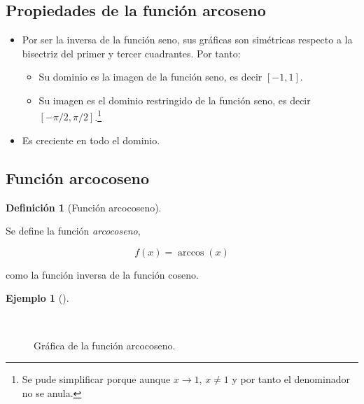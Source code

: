\documentclass[
  a4paper,
]{scrreport}
\providecommand{\tightlist}{%
  \setlength{\itemsep}{0pt}\setlength{\parskip}{0pt}}\usepackage{longtable,booktabs,array}
\theoremstyle{plain}
\theoremstyle{plain}
\theoremstyle{definition}
\newtheorem{definition}{Definición}[chapter]
\theoremstyle{plain}
\theoremstyle{definition}
\newtheorem{example}{Ejemplo}[chapter]
\theoremstyle{remark}
\begin{document}
\hypertarget{propiedades-de-la-funciuxf3n-arcoseno}{%
\subsection{Propiedades de la función
arcoseno}\label{propiedades-de-la-funciuxf3n-arcoseno}}

\begin{itemize}
\tightlist
\item
  Por ser la inversa de la función seno, sus gráficas son simétricas
  respecto a la bisectriz del primer y tercer cuadrantes. Por tanto:

  \begin{itemize}
  \tightlist
  \item
    Su dominio es la imagen de la función seno, es decir \([-1,1]\).
  \item
    Su imagen es el dominio restringido de la función seno, es decir
    \([-\pi/2,\pi/2]\).\footnote{Se pude simplificar porque aunque
      \(x\to 1\), \(x\neq 1\) y por tanto el denominador no se anula.}
  \end{itemize}
\item
  Es creciente en todo el dominio.
\end{itemize}

\hypertarget{funciuxf3n-arcocoseno}{%
\subsection{Función arcocoseno}\label{funciuxf3n-arcocoseno}}

\leavevmode{}%
\begin{definition}[Función arcocoseno]\label{def-funcion-arcocoseno}

Se define la función \emph{arcocoseno},

\[f(x)=\operatorname{arccos}(x)\]

como la función inversa de la función coseno.

\end{definition}

\leavevmode{}%
\begin{example}[]\label{exm-funcion-arcocoseno}

~

\begin{figure}

{\centering 



}

\caption{Gráfica de la función arcocoseno.}

\end{figure}

\end{example}
\end{document}
